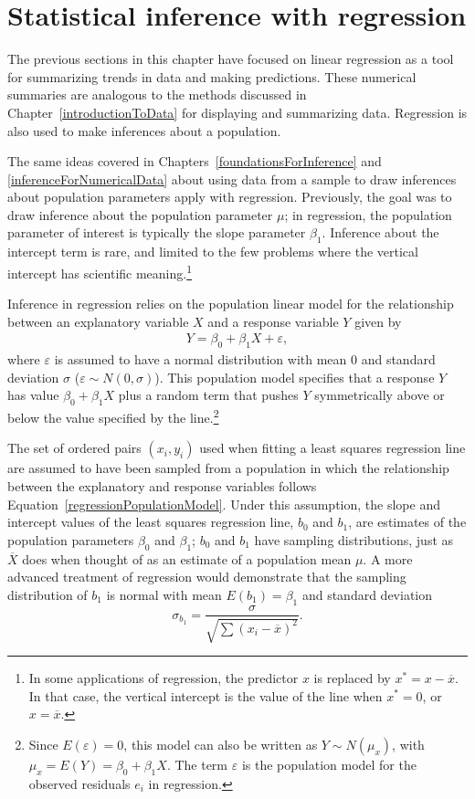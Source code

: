 \section{Statistical inference with regression}
\label{inferenceRegression}

The previous sections in this chapter have focused on linear regression as a tool for summarizing trends in data and making predictions. These numerical summaries are analogous to the methods discussed in Chapter~\ref{introductionToData} for displaying and summarizing data. Regression is also used to make inferences about a population. 

The same ideas covered in Chapters~\ref{foundationsForInference} and \ref{inferenceForNumericalData} about using data from a sample to draw inferences about population parameters apply with regression. Previously, the goal was to draw inference about the population parameter $\mu$; in regression, the population parameter of interest is typically the slope parameter $\beta_1$. Inference about the intercept term is rare, and limited to the few problems where the vertical intercept has scientific meaning.\footnote{In some applications of regression, the predictor $x$ is replaced by $x^* = x - \overline{x}$.  In that case, the vertical intercept is the value of the line when $x^* = 0$, or $x = \overline{x}$.}

Inference in regression relies on the population linear model for the relationship between an explanatory variable $X$ and a response variable $Y$ given by
\begin{align}
Y = \beta_0 + \beta_1 X + \varepsilon,
\label{regressionPopulationModel}
\end{align}
where $\varepsilon$ is assumed to have a normal distribution with mean 0 and standard deviation $\sigma$ ($\varepsilon \sim N(0, \sigma)$).  This population model specifies that a response $Y$ has value $\beta_0 + \beta_1 X$ plus a random term that pushes $Y$ symmetrically above or below the value specified by the line.\footnote{Since $E(\varepsilon) = 0$, this model can also be written as $Y\sim N(\mu_x)$, with $ \mu_x = E(Y) = \beta_0 + \beta_1 X$.  The term $\varepsilon$ is the population model for the observed residuals $e_i$ in regression.} 

The set of ordered pairs $(x_i,y_i)$ used when fitting a least squares regression line are assumed to have been sampled from a population in which the relationship between the explanatory and response variables follows Equation~\ref{regressionPopulationModel}. Under this assumption, the slope and intercept values of the least squares regression line, $b_0$ and $b_1$, are estimates of the population parameters $\beta_0$ and $\beta_1$; $b_0$ and $b_1$ have sampling distributions, just as $\overline{X}$ does when thought of as an estimate of a population mean $\mu$. A more advanced treatment of regression would demonstrate that the sampling distribution of $b_1$ is normal with mean $E(b_1) = \beta_1$ and standard deviation
\[\sigma_{b_1} = \frac{\sigma}{\sqrt{\sum(x_i -\overline{x})^2}}.\]

